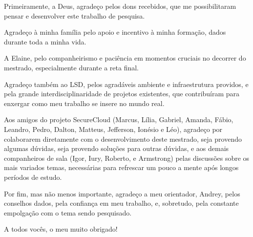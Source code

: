 Primeiramente, a Deus, agradeço pelos dons recebidos, que me possibilitaram
pensar e desenvolver este trabalho de pesquisa.

Agradeço à minha família pelo apoio e incentivo à minha formação, dados durante toda a minha vida.

A Elaine, pelo companheirismo e paciência em momentos cruciais no decorrer do
mestrado, especialmente durante a reta final.

Agradeço também ao LSD, pelos agradáveis ambiente e infraestrutura providos, e
pela grande interdisciplinaridade de projetos existentes, que contribuíram para
enxergar como meu trabalho se insere no mundo real.

Aos amigos do projeto SecureCloud (Marcus, Lília, Gabriel, Amanda, Fábio,
Leandro, Pedro, Dalton, Matteus, Jefferson, Ionésio e Léo), agradeço por
colaborarem diretamente com o desenvolvimento deste mestrado, seja provendo
algumas dúvidas, seja provendo soluções para outras dúvidas, e aos demais
companheiros de sala (Igor, Iury, Roberto, e Armstrong) pelas discussões sobre
os mais variados temas, necessárias para refrescar um pouco a mente após longos
períodos de estudo.

Por fim, mas não menos importante, agradeço a meu orientador, Andrey, pelos
conselhos dados, pela confiança em meu trabalho, e, sobretudo, pela constante
empolgação com o tema sendo pesquisado.

A todos vocês, o meu muito obrigado!